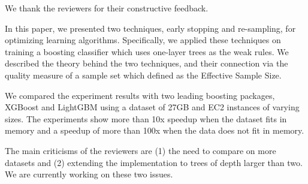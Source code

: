 \documentclass[a4paper, parskip=full]{article}
\begin{document}

We thank the reviewers for their constructive feedback.

In this paper, we presented two techniques, early stopping and
re-sampling, for optimizing learning algorithms. Specifically, we
applied these techniques on training a boosting classifier which uses
one-layer trees as the weak rules. We described the theory behind the
two techniques, and their connection via the quality measure of a sample
set which defined as the Effective Sample Size.

We compared the experiment results with two leading boosting packages,
XGBoost and LightGBM using a dataset of 27GB and EC2 instances of
varying sizes. The experiments show more than 10x speedup when the
dataset fits in memory and a speedup of more than 100x when the data
does not fit in memory.

The main criticisms of the reviewers are (1) the need to compare on more
datasets and (2) extending the implementation to trees of depth larger
than two. We are currently working on these two issues.




\end{document}
